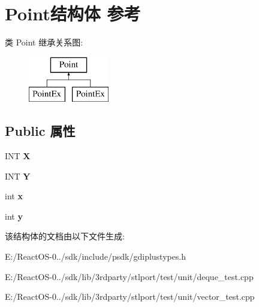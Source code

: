 \hypertarget{struct_point}{}\section{Point结构体 参考}
\label{struct_point}
类 Point 继承关系图\+:\begin{figure}[H]
\begin{center}
\leavevmode
\includegraphics[height=2.000000cm]{struct_point}
\end{center}
\end{figure}
\subsection*{Public 属性}
\begin{DoxyCompactItemize}
\item 
\mbox{\label{struct_point_a1a8b29143b6e93123b802fe6a17e0079}} 
I\+NT {\bfseries X}
\item 
\mbox{\label{struct_point_a952a5c34cb87d933547b1d1b893cad9b}} 
I\+NT {\bfseries Y}
\item 
\mbox{\label{struct_point_a8c779e11e694b20e0946105a9f5de842}} 
int {\bfseries x}
\item 
\mbox{\label{struct_point_a2e1b5fb2b2a83571f5c0bc0f66a73cf7}} 
int {\bfseries y}
\end{DoxyCompactItemize}


该结构体的文档由以下文件生成\+:\begin{DoxyCompactItemize}
\item 
E\+:/\+React\+O\+S-\/0../sdk/include/psdk/gdiplustypes.\+h\item 
E\+:/\+React\+O\+S-\/0../sdk/lib/3rdparty/stlport/test/unit/deque\+\_\+test.\+cpp\item 
E\+:/\+React\+O\+S-\/0../sdk/lib/3rdparty/stlport/test/unit/vector\+\_\+test.\+cpp\end{DoxyCompactItemize}
